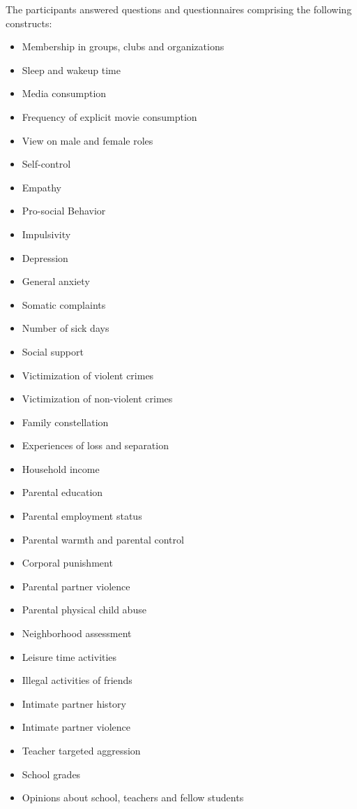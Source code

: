 \documentclass[a4paper,12pt]{article} %
\begin{document}
{The participants answered questions and questionnaires comprising the following constructs:
\setlength{\columnsep}{-0.2in}
\begin{multicols}{3}
	\begin{itemize}
		\setlength{\itemsep}{0pt}%
		\setlength{\parskip}{0pt}
		\item Membership in groups, clubs and organizations
		\item Sleep and wakeup time
		\item Media consumption
		\item Frequency of explicit movie consumption
		\item View on male and female roles
		\item Self-control
		\item Empathy
		\item Pro-social Behavior
		\item Impulsivity
		\item Depression
		\item General anxiety
		\item Somatic complaints
		\item Number of sick days
		\item Social support
		\item Victimization of violent crimes
		\item Victimization of non-violent crimes
		\item Family constellation
		\item Experiences of loss and separation
		\item Household income
		\item Parental education
		\item Parental employment status
		\item Parental warmth and parental control
		\item Corporal punishment
		\item Parental partner violence
		\item Parental physical child abuse
		\item Neighborhood assessment
		\item Leisure time activities
		\item Illegal activities of friends
		\item Intimate partner history
		\item Intimate partner violence
		\item Teacher targeted aggression
		\item School grades
		\item Opinions about school, teachers and fellow students

\end{itemize}
\end{multicols}}
\end{document}
